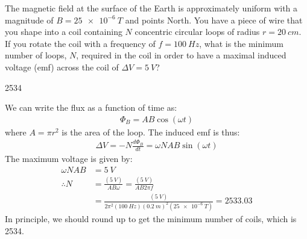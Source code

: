 \question The magnetic field at the surface of the Earth is approximately uniform with a magnitude of $B=\SI{25e-6}{T}$ and points North. You have a piece of wire that you shape into a coil containing $N$ concentric circular loops of radius $r=\SI{20}{cm}$. If you rotate the coil with a frequency of $f=\SI{100}{Hz}$, what is the minimum number of loops, $N$, required in the coil in order to have a maximal induced voltage (emf) across the coil of $\Delta V=\SI{5}{V}$?
\begin{finalanswer}
	2534
\end{finalanswer}
\begin{solution}
	We can write the flux as a function of time as:
	\begin{align*}
	\Phi_B = AB\cos(\omega t)
	\end{align*}
	where $A=\pi r^2$ is the area of the loop. The induced emf is thus:
	\begin{align*}
	\Delta V = -N\frac{d\Phi_B}{dt}=\omega NAB \sin(\omega t)
	\end{align*}
	The maximum voltage is given by:
	\begin{align*}
	\omega  NAB &= \SI{5}{V}\\
	\therefore N&=\frac{(\SI{5}{V})}{AB\omega}=\frac{(\SI{5}{V})}{AB2\pi f}\\
	&=\frac{(\SI{5}{V})}{2\pi^2(\SI{100}{Hz})(\SI{0.2}{m})^2(\SI{25e-6}{T})}=2533.03
	\end{align*}
	In principle, we should round up to get the minimum number of coils, which is 2534.
\end{solution}

